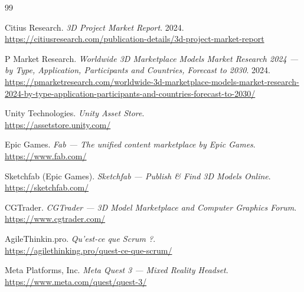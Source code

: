 \documentclass[12pt, a4paper, oneside]{report}
\begin{document}








\clearpage
\renewcommand{\bibname}{Webography}
\begin{thebibliography}{99}

Citius Research. \textit{3D Project Market Report}. 2024.\\
\url{https://citiusresearch.com/publication-details/3d-project-market-report} 

P Market Research. \textit{Worldwide 3D Marketplace Models Market Research 2024 ---
by Type, Application, Participants and Countries, Forecast to 2030}. 2024.\\
\url{https://pmarketresearch.com/worldwide-3d-marketplace-models-market-research-2024-by-type-application-participants-and-countries-forecast-to-2030/} 

Unity Technologies. \textit{Unity Asset Store}.\\
\url{https://assetstore.unity.com/} 

Epic Games. \textit{Fab --- The unified content marketplace by Epic Games}.\\
\url{https://www.fab.com/} 

Sketchfab (Epic Games). \textit{Sketchfab --- Publish \& Find 3D Models Online}.\\
\url{https://sketchfab.com/} 

CGTrader. \textit{CGTrader --- 3D Model Marketplace and Computer Graphics Forum}.\\
\url{https://www.cgtrader.com/} 

AgileThinkin.pro. \textit{Qu'est-ce que Scrum ?}.\\
\url{https://agilethinking.pro/quest-ce-que-scrum/} 

Meta Platforms, Inc. \textit{Meta Quest 3 --- Mixed Reality Headset}.\\
\url{https://www.meta.com/quest/quest-3/} 


\end{thebibliography}
\end{document}
